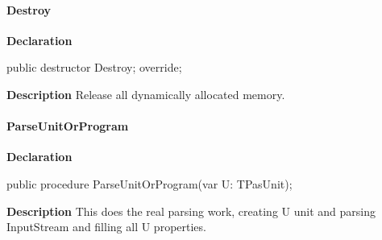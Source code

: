 \documentclass{report}
\newif\ifpdf
\begin{document}
\paragraph*{Destroy}\hspace*{\fill}

\label{PasDoc_Parser.TParser-Destroy}
\begin{list}{}{
\setlength{\itemindent}{0cm}
\setlength{\listparindent}{0cm}
\setlength{\leftmargin}{\evensidemargin}
\addtolength{\leftmargin}{\tmplength}
\settowidth{\labelsep}{X}
\addtolength{\leftmargin}{\labelsep}
\setlength{\labelwidth}{\tmplength}
}
\item[\textbf{Declaration}\hfill]
\ifpdf
\begin{flushleft}
\fi
\begin{ttfamily}
public destructor Destroy; override;\end{ttfamily}

\ifpdf
\end{flushleft}
\fi

\par
\item[\textbf{Description}]
Release all dynamically allocated memory.

\end{list}
\paragraph*{ParseUnitOrProgram}\hspace*{\fill}

\label{PasDoc_Parser.TParser-ParseUnitOrProgram}
\begin{list}{}{
\setlength{\itemindent}{0cm}
\setlength{\listparindent}{0cm}
\setlength{\leftmargin}{\evensidemargin}
\addtolength{\leftmargin}{\tmplength}
\settowidth{\labelsep}{X}
\addtolength{\leftmargin}{\labelsep}
\setlength{\labelwidth}{\tmplength}
}
\item[\textbf{Declaration}\hfill]
\ifpdf
\begin{flushleft}
\fi
\begin{ttfamily}
public procedure ParseUnitOrProgram(var U: TPasUnit);\end{ttfamily}

\ifpdf
\end{flushleft}
\fi

\par
\item[\textbf{Description}]
This does the real parsing work, creating U unit and parsing InputStream and filling all U properties.

\end{list}
\end{document}
